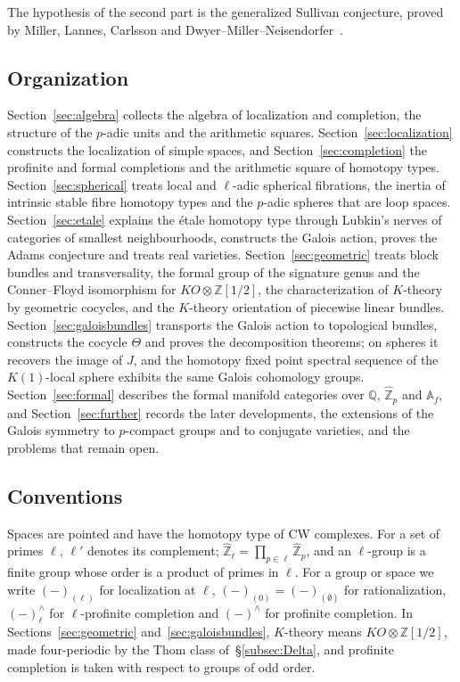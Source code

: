 \documentclass[11pt]{amsart}
\theoremstyle{plain}
\theoremstyle{definition}
\numberwithin{equation}{section}
\newcommand{\Z}{\mathbb{Z}}
\newcommand{\Q}{\mathbb{Q}}
\newcommand{\Zhat}{\widehat{\mathbb{Z}}}
\newcommand{\Af}{\mathbb{A}_f}
\newcommand{\KO}{\mathit{KO}}
\begin{document}
The hypothesis of the second part is the generalized Sullivan conjecture, proved by Miller, Lannes, Carlsson and Dwyer--Miller--Neisendorfer~\cite{Miller,Lannes,Carlsson,DMN}.

\subsection*{Organization}
Section~\ref{sec:algebra} collects the algebra of localization and completion, the structure of the $p$-adic units and the arithmetic squares.
Section~\ref{sec:localization} constructs the localization of simple spaces, and Section~\ref{sec:completion} the profinite and formal completions and the arithmetic square of homotopy types.
Section~\ref{sec:spherical} treats local and $\ell$-adic spherical fibrations, the inertia of intrinsic stable fibre homotopy types and the $p$-adic spheres that are loop spaces.
Section~\ref{sec:etale} explains the \'etale homotopy type through Lubkin's nerves of categories of smallest neighbourhoods, constructs the Galois action, proves the Adams conjecture and treats real varieties.
Section~\ref{sec:geometric} treats block bundles and transversality, the formal group of the signature genus and the Conner--Floyd isomorphism for $\KO\otimes\Z[1/2]$, the characterization of $K$-theory by geometric cocycles, and the $K$-theory orientation of piecewise linear bundles.
Section~\ref{sec:galoisbundles} transports the Galois action to topological bundles, constructs the cocycle $\Theta$ and proves the decomposition theorems; on spheres it recovers the image of $J$, and the homotopy fixed point spectral sequence of the $K(1)$-local sphere exhibits the same Galois cohomology groups.
Section~\ref{sec:formal} describes the formal manifold categories over $\Q$, $\Zhat_p$ and $\Af$, and Section~\ref{sec:further} records the later developments, the extensions of the Galois symmetry to $p$-compact groups and to conjugate varieties, and the problems that remain open.

\subsection*{Conventions}
Spaces are pointed and have the homotopy type of CW complexes.
For a set of primes $\ell$, $\ell'$ denotes its complement; $\Zhat_\ell=\prod_{p\in\ell}\Zhat_p$, and an $\ell$-group is a finite group whose order is a product of primes in $\ell$.
For a group or space we write $(-)_{(\ell)}$ for localization at $\ell$, $(-)_{(0)}=(-)_{(\emptyset)}$ for rationalization, $(-)^\wedge_\ell$ for $\ell$-profinite completion and $(-)^\wedge$ for profinite completion.
In Sections~\ref{sec:geometric} and~\ref{sec:galoisbundles}, $K$-theory means $\KO\otimes\Z[1/2]$, made four-periodic by the Thom class of~\S\ref{subsec:Delta}, and profinite completion is taken with respect to groups of odd order.
\end{document}

